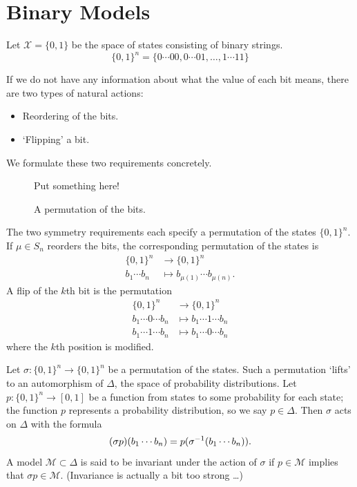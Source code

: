 \documentclass[cclicense]{hmcthesis}
\providecommand*{\xs}{\mathcal X}
\providecommand*{\ms}{\mathcal M}
\numberwithin{equation}{chapter}
\numberwithin{thmcounter}{chapter}
\begin{document}
\section{Binary Models}

    Let $\xs = \{0, 1\}$ be the space of states consisting of binary strings.
    \[
        \{0, 1\}^n = \{0\cdots00, 0\cdots01, \ldots, 1\cdots11\}
    \]
    
    If we do not have any information about what the value of each bit means,
    there are two types of natural actions:
    \begin{itemize}\nospace
    \item Reordering of the bits.
    \item `Flipping' a bit.
    \end{itemize}
    We formulate these two requirements concretely.  

    \begin{figure}[H]
        \centering
        Put something here!
        \caption{A permutation of the bits.}
    \end{figure}
    
    The two symmetry requirements each specify a permutation of the states $\{0,
    1\}^n$.  If $\mu \in S_n$ reorders the bits, the corresponding permutation
    of the states is
    \begin{align*}
        \{0, 1\}^n &\to \{0, 1\}^n \\
        b_1 \cdots b_n &\mapsto b_{\mu(1)} \cdots b_{\mu(n)}.
    \end{align*}
    A flip of the $k$th bit is the permutation
    \begin{align*}
        \{0, 1\}^n &\to \{0, 1\}^n \\
        b_1 \cdots 0 \cdots b_n 
        &\mapsto
        b_1 \cdots 1 \cdots b_n  \\
        b_1 \cdots 1 \cdots b_n 
        &\mapsto
        b_1 \cdots 0 \cdots b_n
    \end{align*}
    where the $k$th position is modified.  
    
    Let $\sigma: \{0, 1\}^n \to \{0, 1\}^n$ be a permutation of the states.
    Such a permutation `lifts' to an automorphism of $\Delta$, the space of
    probability distributions.  Let $p: \{0, 1\}^n \to [0, 1]$ be a function
    from states to some probability for each state; the function $p$ represents
    a probability distribution, so we say $p \in \Delta$.  Then $\sigma$ acts on
    $\Delta$ with the formula
    \begin{equation}
        (\sigma p)(b_1 \cdots b_n) = p(\sigma^{-1}(b_1 \cdots b_n)).
        \label{eq:sigma-p}
    \end{equation}
    A model $\ms \subset \Delta$ is said to be invariant under the action of
    $\sigma$ if $p \in \ms$ implies that $\sigma p \in \ms$.  (Invariance is
    actually a bit too strong \ldots)
\end{document}
